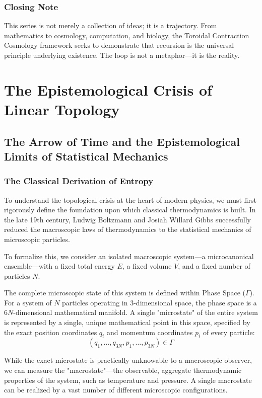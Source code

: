 \documentclass[12pt,openany]{book}
\theoremstyle{plain}
\theoremstyle{definition}
\theoremstyle{remark}
\begin{document}
\section{Closing Note}
This series is not merely a collection of ideas; it is a trajectory. From mathematics 
to cosmology, computation, and biology, the Toroidal Contraction Cosmology framework 
seeks to demonstrate that recursion is the universal principle underlying existence. 
The loop is not a metaphor—it is the reality.

\mainmatter

\part{The Epistemological Crisis of Linear Topology}

\chapter{The Arrow of Time and the Epistemological Limits of Statistical Mechanics}

\section{The Classical Derivation of Entropy}
To understand the topological crisis at the heart of modern physics, we must first rigorously define the foundation upon which classical thermodynamics is built. In the late 19th century, Ludwig Boltzmann and Josiah Willard Gibbs successfully reduced the macroscopic laws of thermodynamics to the statistical mechanics of microscopic particles.

To formalize this, we consider an isolated macroscopic system—a microcanonical ensemble—with a fixed total energy $E$, a fixed volume $V$, and a fixed number of particles $N$.

The complete microscopic state of this system is defined within Phase Space ($\Gamma$). For a system of $N$ particles operating in 3-dimensional space, the phase space is a $6N$-dimensional mathematical manifold. A single "microstate" of the entire system is represented by a single, unique mathematical point in this space, specified by the exact position coordinates $q_i$ and momentum coordinates $p_i$ of every particle:$$(q_1, \dots, q_{3N}, p_1, \dots, p_{3N}) \in \Gamma$$

While the exact microstate is practically unknowable to a macroscopic observer, we can measure the "macrostate"—the observable, aggregate thermodynamic properties of the system, such as temperature and pressure. A single macrostate can be realized by a vast number of different microscopic configurations.
\end{document}
